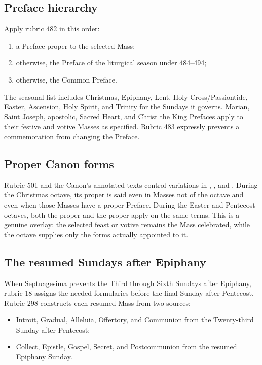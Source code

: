 \subsection{Preface hierarchy}

Apply rubric 482 in this order:

\begin{enumerate}[leftmargin=1.45em]
\item a Preface proper to the selected Mass;
\item otherwise, the Preface of the liturgical season under 484--494;
\item otherwise, the Common Preface.
\end{enumerate}

The seasonal list includes Christmas, Epiphany, Lent, Holy Cross/Passiontide, Easter, Ascension, Holy Spirit, and Trinity for the Sundays it governs. Marian, Saint Joseph, apostolic, Sacred Heart, and Christ the King Prefaces apply to their festive and votive Masses as specified. Rubric 483 expressly prevents a commemoration from changing the Preface.

\subsection{Proper Canon forms}

Rubric 501 and the Canon's annotated texts control variations in , , and . During the Christmas octave, its proper  is said even in Masses not of the octave and even when those Masses have a proper Preface. During the Easter and Pentecost octaves, both the proper  and the proper  apply on the same terms. This is a genuine overlay: the selected feast or votive remains the Mass celebrated, while the octave supplies only the forms actually appointed to it.

\subsection{The resumed Sundays after Epiphany}

When Septuagesima prevents the Third through Sixth Sundays after Epiphany, rubric 18 assigns the needed formularies before the final Sunday after Pentecost. Rubric 298 constructs each resumed Mass from two sources:

\begin{itemize}
\item Introit, Gradual, Alleluia, Offertory, and Communion from the Twenty-third Sunday after Pentecost;
\item Collect, Epistle, Gospel, Secret, and Postcommunion from the resumed Epiphany Sunday.
\end{itemize}

